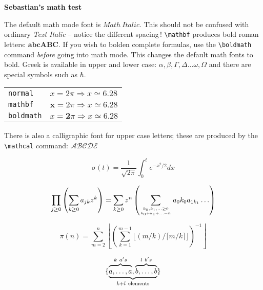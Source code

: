 \documentclass[11pt]{article}
\begin{document}
\begin{center}
\bfseries\Large Sebastian's math test
\end{center}
The default math mode font is \(Math\ Italic\). This should not be
confused with ordinary \emph{Text Italic} -- notice the different spacing\,!
\verb|\mathbf| produces bold roman letters: \( \mathbf{abcABC} \).
If you wish to bolden complete formulas,
use the \verb|\boldmath| command \emph{before} going into math mode.  
This changes the default math fonts to bold. 
Greek is available in upper and lower case:
\(\alpha,\beta, \Gamma, \Delta \dots \omega, \Omega\) and there are special
symbols such as \( \hbar\).
 
\begin{tabular}{ll}
\texttt{normal}   & \( x = 2\pi \Rightarrow x \simeq 6.28 \)\\
\texttt{mathbf}   & \(\mathbf{x} = 2\pi \Rightarrow x \simeq 6.28 \)\\
\texttt{boldmath} & {\boldmath \(x = \mathbf{2}\pi \Rightarrow x 
                    \simeq{\mathbf{6.28}}              \)}\\
\end{tabular}
 
\noindent There is also a calligraphic font for upper case letters;
these are produced by the \verb|\mathcal| command: \( \mathcal{ABCDE} \)
 
\begin{equation}
  \sigma(t)=\frac{1}{\sqrt{2\pi}}
  \int^t_0 e^{-x^2/2} dx 
\end{equation}

\begin{equation}
  \prod_{j\geq 0}
  \left(\sum_{k\geq 0}a_{jk} z^k\right) 
= \sum_{k\geq 0} z^n
  \left( \sum_{{k_0,k_1,\ldots\geq 0}
          \atop{k_0+k_1+\ldots=n}    }
        a{_0k_0}a_{1k_1}\ldots  \right) 
\end{equation}

\begin{equation}
\pi(n) = \sum_{m=2}^{n}
  \left\lfloor \left(\sum_{k=1}^{m-1}
       \lfloor(m/k)/\lceil m/k\rceil 
       \rfloor \right)^{-1}
  \right\rfloor
\end{equation}

\begin{equation}
\{\underbrace{%
    \overbrace{\mathstrut a,\ldots,a}^{k\ a's},
    \overbrace{\mathstrut b,\ldots,b}^{l\ b's}}
  _{k+l\ \mathrm{elements}}                   \}
\end{equation}
\end{document}
